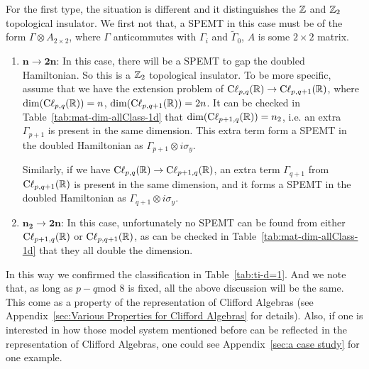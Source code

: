 \begin{enumerate}
    For the first type, the situation is different and it distinguishes the $\mathbb{Z}$
    and $\mathbb{Z}_2$ topological insulator. We first not that, a SPEMT in this case
    must be of the form $\Gamma\otimes A_{2\times 2}$, where $\Gamma$
    anticommutes with $\Gamma_i$ and $\tilde{\Gamma}_0$, $A$ is some $2\times 2$
    matrix.
    \begin{enumerate}
        \item $\mathbf{n\to 2n}$: In this case, there will be a SPEMT to gap
            the doubled Hamiltonian. So this is a $\mathbb{Z}_2$ topological insulator.
            To be more specific, assume that we have the extension problem of
            $\mathrm{C\ell}_{p,q}(\mathbb{R})\to\mathrm{C\ell}_{p,q+1}(\mathbb{R})$, where
            $\mathrm{dim}(\mathrm{C\ell}_{p,q}(\mathbb{R}))=n$,
            $\mathrm{dim}(\mathrm{C\ell}_{p,q+1}(\mathbb{R}))=2n$. It can be checked in
            Table~\ref{tab:mat-dim-allClass-1d} that
            $\mathrm{dim}(\mathrm{C\ell}_{p+1,q}(\mathbb{R}))=n_2$, i.e. an extra
            $\Gamma_{p+1}$ is present in the same dimension. This extra term
            form a SPEMT in the doubled Hamiltonian as $\Gamma_{p+1}\otimes
            i\sigma_y$.

            Similarly, if we have $\mathrm{C\ell}_{p,q}(\mathbb{R})\to
            \mathrm{C\ell}_{p+1,q}(\mathbb{R})$, an extra term $\Gamma_{q+1}$ from
            $\mathrm{C\ell}_{p,q+1}(\mathbb{R})$ is present in the same dimension, and
            it forms a SPEMT in the doubled Hamiltonian as $\Gamma_{q+1}\otimes
            i\sigma_y$.
        \item $\mathbf{n_2\to 2n}$: In this case, unfortunately no SPEMT can be
            found from either $\mathrm{C\ell}_{p+1,q}(\mathbb{R})$ or
            $\mathrm{C\ell}_{p,q+1}(\mathbb{R})$, as can be checked in
            Table~\ref{tab:mat-dim-allClass-1d} that they all double the
            dimension.
    \end{enumerate}
\end{enumerate}

In this way we confirmed the classification in Table~\ref{tab:ti-d=1}. And we
note that, as long as $p-q \text{mod 8}$ is fixed, all the above discussion will
be the same. This come as a property of the representation of Clifford Algebras
(see Appendix~\ref{sec:Various Properties for Clifford Algebras} for details).
Also, if one is interested in how those model system mentioned before can be
reflected in the representation of Clifford Algebras, one could see
Appendix~\ref{sec:a case study} for one example.

